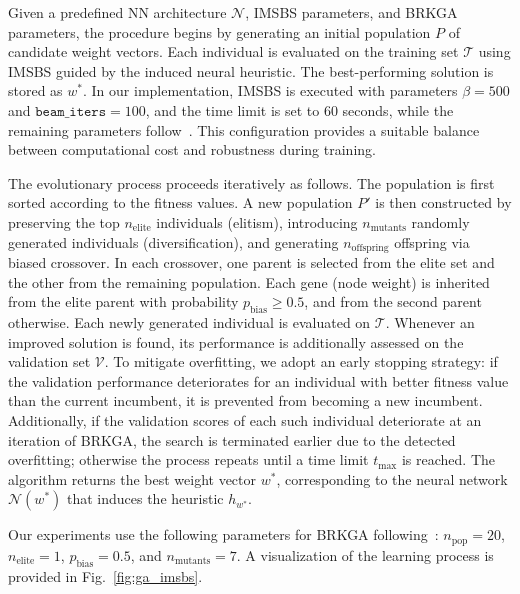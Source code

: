 \documentclass[runningheads]{llncs}
\begin{document}
 Given a predefined NN architecture $\mathcal{N}$, IMSBS parameters, and BRKGA parameters, the procedure begins by generating an initial population $P$ of candidate weight vectors. Each individual is evaluated on the training set $\mathcal{T}$ using IMSBS guided by the induced neural heuristic. The best-performing solution is stored as $w^\ast$. In our implementation, IMSBS is executed with parameters $\beta=500$ and $\texttt{beam\_iters}=100$, and the time limit is set to 60 seconds, while the remaining parameters follow~\cite{djukanovic2026_eurocast}. This configuration provides a suitable balance between computational cost and robustness during training.
 
 The evolutionary process proceeds iteratively as follows. The population is first sorted according to the fitness values. A new population $P'$ is then constructed by preserving the top $n_{\text{elite}}$ individuals (elitism), introducing $n_{\text{mutants}}$ randomly generated individuals (diversification), and generating $n_{\text{offspring}}$ offspring via biased crossover. In each crossover, one parent is selected from the elite set and the other from the remaining population. Each gene (node weight) is inherited from the elite parent with probability $p_{\text{bias}} \geq 0.5$, and from the second parent otherwise. Each newly generated individual is evaluated on $\mathcal{T}$. Whenever an improved solution is found, its performance is additionally assessed on the validation set $\mathcal{V}$. To mitigate overfitting, we adopt an early stopping strategy: if the validation performance deteriorates for an individual with better fitness value than the current incumbent, it is prevented from becoming a new incumbent. Additionally, if the validation scores of each such individual deteriorate at an iteration of BRKGA, the search is terminated earlier due to the detected overfitting; otherwise the process repeats until a time limit $t_{\max}$ is reached. The algorithm returns the best weight vector $w^\ast$, corresponding to the neural network $\mathcal{N}(w^\ast)$ that induces the heuristic $h_{w^\ast}$.
 
 Our experiments use the following parameters for BRKGA following~\cite{reixach2024neural}:  $n_{\text{pop}}=20$, $n_{\text{elite}}=1$, $p_{\text{bias}}=0.5$, and $n_{\text{mutants}}=7$. A visualization of the learning process is provided in Fig.~\ref{fig:ga_imsbs}.
\end{document}
